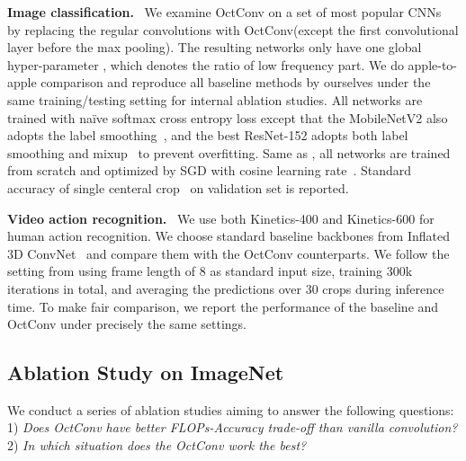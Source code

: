 \documentclass[10pt,twocolumn,letterpaper]{article}
\newcommand{\hiConv}[0]{OctConv\xspace}
\newcommand{\myparagraph}[1]{\vspace{1pt}\noindent\textbf{#1.}~}
\begin{document}
\myparagraph{Image classification} We examine \hiConv on a set of most popular CNNs~\cite{MobileNetV1,MobileNetV2,ResNetV1,ResNetV2,densenet,ResNeXt,SENet} by replacing the regular convolutions with \hiConv (except the first convolutional layer before the max pooling). The resulting networks only have one global hyper-parameter , which denotes the ratio of low frequency part. We do apple-to-apple comparison and reproduce all baseline methods by ourselves under the same training/testing setting for internal ablation studies. All networks are trained with na\"ive softmax cross entropy loss except that the MobileNetV2 also adopts the label smoothing~\cite{InceptionV4}, and the best ResNet-152 adopts both label smoothing and mixup~\cite{mixup} to prevent overfitting. Same as \cite{bLNet}, all networks are trained from scratch and optimized by SGD with cosine learning rate~\cite{imnet1hour}. Standard accuracy of single centeral crop~\cite{ResNetV1,ResNetV2,ResNeXt,bLNet,ELASTIC} on validation set is reported.



\myparagraph{Video action recognition}
We use both Kinetics-400 \cite{kay2017kinetics, k400} and Kinetics-600 \cite{k600} for human action recognition. We choose standard baseline backbones from Inflated 3D ConvNet~\cite{nonlocal} and compare them with the \hiConv counterparts. We follow the setting from \cite{nonlocal-git} using frame length of 8 as standard input size,  training 300k iterations in total, and averaging the predictions over 30 crops during inference time. To make fair comparison, we report the performance of the baseline and \hiConv under precisely the same settings.


\subsection{Ablation Study on ImageNet}
\label{sec:exp:imgcls}
\label{sec:exp:imgcls:ablation}

We conduct a series of ablation studies aiming to answer the following questions: 
1) \textit{Does \hiConv have better FLOPs-Accuracy trade-off than vanilla convolution? }
2) \textit{In which situation does the \hiConv work the best?}
\end{document}
